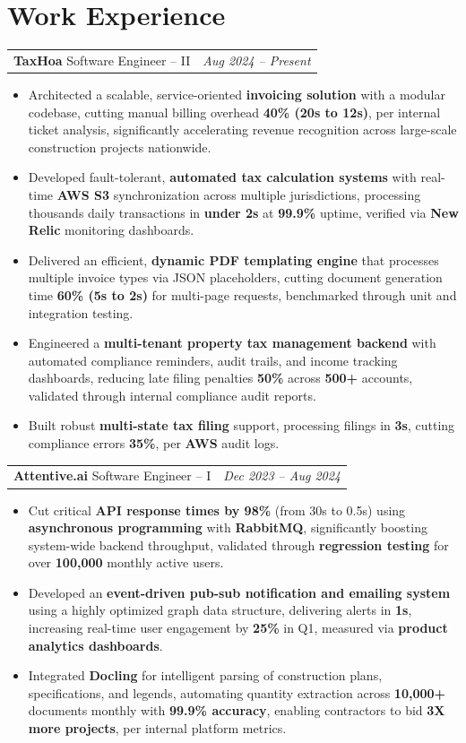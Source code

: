 \documentclass[letterpaper, 10pt]{article}
\makeatletter
\newcommand{\workEntry}[3]{%
  \begin{tabular*}{\textwidth}[t]{l@{\extracolsep{\fill}}r}
    \textbf{#1} \textbar{} \small #3 & \small\textit{#2}
  \end{tabular*}%
  \vspace{-2pt}%
}
\newcommand{\bi}[1]{\item\small #1}
\makeatother
\begin{document}
\section{Work Experience}

\workEntry{TaxHoa}{Aug 2024 -- Present}{Software Engineer -- II}
\begin{itemize}
  \bi{Architected a scalable, service-oriented \textbf{invoicing solution} with a modular codebase, cutting manual billing overhead \textbf{40\% (20s to 12s)}, per internal ticket analysis, significantly accelerating revenue recognition across large-scale construction projects nationwide.}
  \bi{Developed fault-tolerant, \textbf{automated tax calculation systems} with real-time \textbf{AWS S3} synchronization across multiple jurisdictions, processing thousands daily transactions in \textbf{under 2s} at \textbf{99.9\%} uptime, verified via \textbf{New Relic} monitoring dashboards.}
  \bi{Delivered an efficient, \textbf{dynamic PDF templating engine} that processes multiple invoice types via JSON placeholders, cutting document generation time \textbf{60\% (5s to 2s)} for multi-page requests, benchmarked through unit and integration testing.}
  \bi{Engineered a \textbf{multi-tenant property tax management backend} with automated compliance reminders, audit trails, and income tracking dashboards, reducing late filing penalties \textbf{50\%} across \textbf{500+} accounts, validated through internal compliance audit reports.}
    \bi{Built robust \textbf{multi-state tax filing} support, processing filings in \textbf{3s}, cutting compliance errors \textbf{35\%}, per \textbf{AWS} audit logs.}
    
\end{itemize}

\vspace{2pt}

\workEntry{Attentive.ai}{Dec 2023 -- Aug 2024}{Software Engineer -- I}
\begin{itemize}
  \bi{Cut critical \textbf{API response times by 98\%} (from 30s to 0.5s) using \textbf{asynchronous programming} with \textbf{RabbitMQ}, significantly boosting system-wide backend throughput, validated through \textbf{regression testing} for over \textbf{100,000} monthly active users.}
  \bi{Developed an \textbf{event-driven pub-sub notification and emailing system} using a highly optimized graph data structure, delivering alerts in \textbf{1s}, increasing real-time user engagement by \textbf{25\%} in Q1, measured via \textbf{product analytics dashboards}.}
  \bi{Integrated \textbf{Docling} for intelligent parsing of construction plans, specifications, and legends, automating quantity extraction across \textbf{10,000+} documents monthly with \textbf{99.9\% accuracy}, enabling contractors to bid \textbf{3X more projects}, per internal platform metrics.}
\end{itemize}
\end{document}
